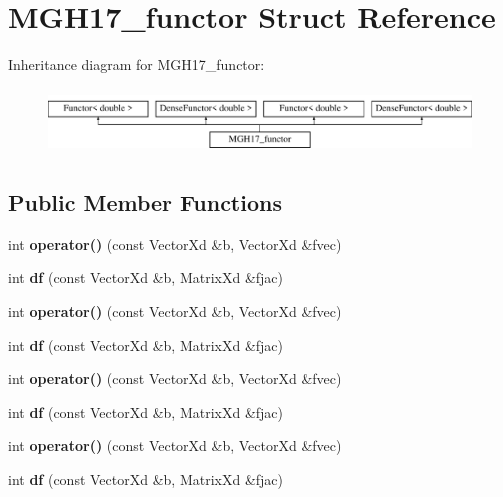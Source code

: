 \hypertarget{struct_m_g_h17__functor}{}\section{M\+G\+H17\+\_\+functor Struct Reference}
\label{struct_m_g_h17__functor}
Inheritance diagram for M\+G\+H17\+\_\+functor\+:\begin{figure}[H]
\begin{center}
\leavevmode
\includegraphics[height=1.728395cm]{struct_m_g_h17__functor}
\end{center}
\end{figure}
\subsection*{Public Member Functions}
\begin{DoxyCompactItemize}
\item 
\mbox{\label{struct_m_g_h17__functor_aaa14465375372f77aa86383107c76fa4}} 
int {\bfseries operator()} (const Vector\+Xd \&b, Vector\+Xd \&fvec)
\item 
\mbox{\label{struct_m_g_h17__functor_ab9474921bf8e110577406bdabd13a8c1}} 
int {\bfseries df} (const Vector\+Xd \&b, Matrix\+Xd \&fjac)
\item 
\mbox{\label{struct_m_g_h17__functor_aaa14465375372f77aa86383107c76fa4}} 
int {\bfseries operator()} (const Vector\+Xd \&b, Vector\+Xd \&fvec)
\item 
\mbox{\label{struct_m_g_h17__functor_ab9474921bf8e110577406bdabd13a8c1}} 
int {\bfseries df} (const Vector\+Xd \&b, Matrix\+Xd \&fjac)
\item 
\mbox{\label{struct_m_g_h17__functor_aaa14465375372f77aa86383107c76fa4}} 
int {\bfseries operator()} (const Vector\+Xd \&b, Vector\+Xd \&fvec)
\item 
\mbox{\label{struct_m_g_h17__functor_ab9474921bf8e110577406bdabd13a8c1}} 
int {\bfseries df} (const Vector\+Xd \&b, Matrix\+Xd \&fjac)
\item 
\mbox{\label{struct_m_g_h17__functor_aaa14465375372f77aa86383107c76fa4}} 
int {\bfseries operator()} (const Vector\+Xd \&b, Vector\+Xd \&fvec)
\item 
\mbox{\label{struct_m_g_h17__functor_ab9474921bf8e110577406bdabd13a8c1}} 
int {\bfseries df} (const Vector\+Xd \&b, Matrix\+Xd \&fjac)
\end{DoxyCompactItemize}
